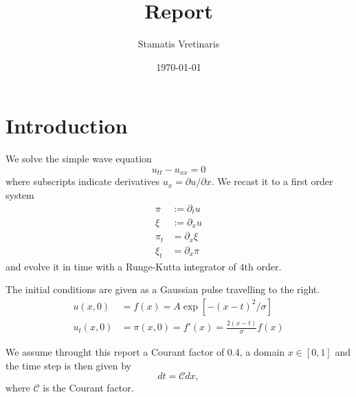 \documentclass[reprint, aps, prd, nofootinbib, superscriptaddress, floatfix]{revtex4-2}  %
\begin{document}
\title{Report}

\author{Stamatis Vretinaris}


\date{\today}

\begin{abstract}

\end{abstract}

\maketitle
\section{Introduction}
We solve the simple wave equation
\begin{equation}
  \label{eq:wave-equation}
  u_{tt} - u_{xx} = 0
\end{equation}
where subscripts indicate derivatives $u_x = \partial u /\partial x$. We recast it to a first order system
\begin{align}
  \label{eq:1st-order-system}
  \pi &:= \partial_t u \nonumber \\
  \xi &:= \partial_x u \\
  \pi_t &= \partial_x \xi \nonumber\\
  \xi_t &= \partial_x \pi \nonumber
\end{align}
and evolve it in time with a Runge-Kutta integrator of 4th order.

The initial conditions are given as a Gaussian pulse travelling to the right.
\begin{align}
  \label{eq:initial-conditions}
  u(x,0) &= f(x) = A \exp[-(x-t)^2/\sigma] \\
  u_t(x,0) &= \pi(x,0) = f'(x) = \frac{2 (x-t)}{\sigma} f(x)
\end{align}

We assume throught this report a Courant factor of 0.4, a domain $x\in[0,1]$ and the time step is then given by
\begin{equation}
  \label{eq:timestep}
  dt = \mathcal{C} dx,
\end{equation}
where $\mathcal{C}$ is the Courant factor.
\end{document}
